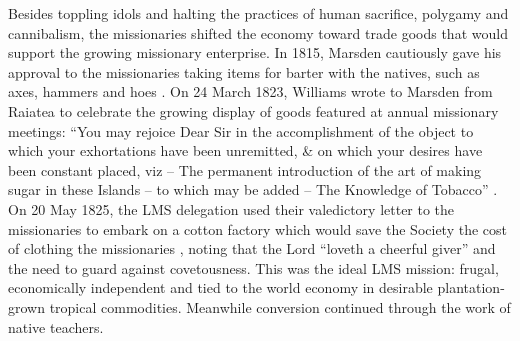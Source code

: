Besides toppling idols and halting the practices of human sacrifice, polygamy and cannibalism, the missionaries shifted the economy toward trade goods that would support the growing missionary enterprise. In 1815, Marsden cautiously gave his approval to the missionaries taking items for barter with the natives, such as axes, hammers and hoes \citep{marsden_letter_1818}. On 24 March 1823, Williams wrote to Marsden from Raiatea to celebrate the growing display of goods featured at annual missionary meetings: “You may rejoice Dear Sir in the accomplishment of the object to which your exhortations have been unremitted, \& on which your desires have been constant placed, viz -- The permanent introduction of the art of making sugar in these Islands -- to which may be added -- The Knowledge of Tobacco” \citep[box 2/ folder 2]{lms_australia_1798-1968}. On 20 May 1825, the LMS delegation used their valedictory letter to the missionaries to embark on a cotton factory which would save the Society the cost of clothing the missionaries \citep[299]{tyerman_extracts_1827}, noting that the Lord “loveth a cheerful giver” and the need to guard against covetousness. This was the ideal LMS mission: frugal, economically independent and tied to the world economy in desirable plantation-grown tropical commodities. Meanwhile conversion continued through the work of native teachers.

